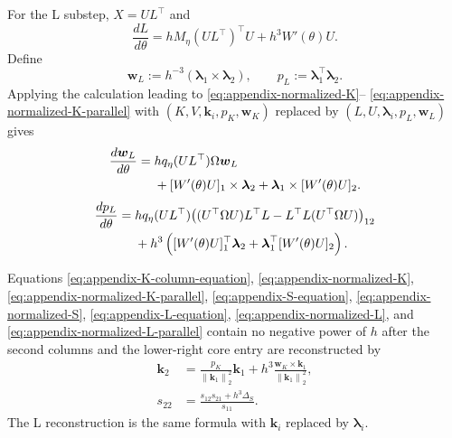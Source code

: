 \documentclass[]{article}
\numberwithin{equation}{section}
\theoremstyle{plain}
\theoremstyle{remark}
\newcommand{\norm}[1]{\left\lVert #1\right\rVert}
\begin{document}
For the L substep, $X=UL^\top$ and
\begin{equation}\label{eq:appendix-L-equation}
 \frac{dL}{d\theta}
 =hM_\eta(UL^\top)^\top U+h^3W'(\theta)U.
\end{equation}
Define
\begin{equation}\label{eq:appendix-L-area-definition}
 \boldsymbol w_L:=h^{-3}(\boldsymbol\lambda_1\times\boldsymbol\lambda_2),
 \qquad p_L:=\boldsymbol\lambda_1^\top\boldsymbol\lambda_2.
\end{equation}
Applying the calculation leading to
\eqref{eq:appendix-normalized-K}--
\eqref{eq:appendix-normalized-K-parallel} with
$(K,V,\boldsymbol k_i,p_K,\boldsymbol w_K)$ replaced by
$(L,U,\boldsymbol\lambda_i,p_L,\boldsymbol w_L)$ gives
\begin{align}
 \frac{d\boldsymbol w_L}{d\theta}
 ={}&hq_\eta(UL^\top)\Omega
 \boldsymbol w_L
 \notag\\
 &+[W'(\theta)U]_1\times\boldsymbol\lambda_2
 +\boldsymbol\lambda_1\times[W'(\theta)U]_2.
 \label{eq:appendix-normalized-L}
\end{align}
\begin{align}
 \frac{dp_L}{d\theta}
 ={}&hq_\eta(UL^\top)
 \bigl((U^\top\Omega U)L^\top L
       -L^\top L(U^\top\Omega U)\bigr)_{12}\notag\\
 &+h^3\left(
 [W'(\theta)U]_1^\top\boldsymbol\lambda_2
 +\boldsymbol\lambda_1^\top[W'(\theta)U]_2\right).
 \label{eq:appendix-normalized-L-parallel}
\end{align}

Equations \eqref{eq:appendix-K-column-equation},
\eqref{eq:appendix-normalized-K},
\eqref{eq:appendix-normalized-K-parallel},
\eqref{eq:appendix-S-equation},
\eqref{eq:appendix-normalized-S},
\eqref{eq:appendix-L-equation},
\eqref{eq:appendix-normalized-L}, and
\eqref{eq:appendix-normalized-L-parallel} contain no negative power of
$h$ after the second columns and the lower-right core entry are
reconstructed by
\begin{align}
 \boldsymbol k_2
 &=\frac{p_K}{\norm{\boldsymbol k_1}_2^2}\boldsymbol k_1
 +h^3\frac{\boldsymbol w_K\times\boldsymbol k_1}
 {\norm{\boldsymbol k_1}_2^2},
 \label{eq:appendix-QR-reconstruction}\\
 s_{22}&=\frac{s_{12}s_{21}+h^3\Delta_S}{s_{11}}.
 \label{eq:appendix-core-reconstruction}
\end{align}
The L reconstruction is the same formula with
\(\boldsymbol k_i\) replaced by \(\boldsymbol\lambda_i\).
\end{document}
